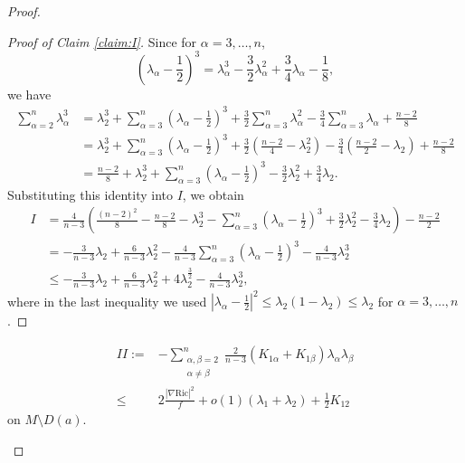 \documentclass[10pt,a4paper]{amsart}
\begin{document}
\begin{proof}
\begin{proof}[Proof of Claim \ref{claim:I}]
		Since for $\alpha = 3, \ldots, n$,
		\[
		\left(\lambda_\alpha - \frac{1}{2}\right)^3 = \lambda_\alpha^3 - \frac{3}{2}\lambda_\alpha^2 + \frac{3}{4}\lambda_\alpha - \frac{1}{8},
		\]
		we have
		\begin{align*}
			\sum_{\alpha=2}^n \lambda_\alpha^3 &= \lambda_2^3 + \sum_{\alpha=3}^n\left(\lambda_\alpha - \frac{1}{2}\right)^3 + \frac{3}{2}\sum_{\alpha=3}^n\lambda_\alpha^2 - \frac{3}{4}\sum_{\alpha=3}^n\lambda_\alpha + \frac{n-2}{8} \\
			&= \lambda_2^3 + \sum_{\alpha=3}^n\left(\lambda_\alpha - \frac{1}{2}\right)^3 + \frac{3}{2}\left(\frac{n-2}{4} - \lambda_2^2\right) - \frac{3}{4}\left(\frac{n-2}{2} - \lambda_2\right) + \frac{n-2}{8} \\
			&= \frac{n-2}{8} + \lambda_2^3 + \sum_{\alpha=3}^n\left(\lambda_\alpha - \frac{1}{2}\right)^3 - \frac{3}{2}\lambda_2^2 + \frac{3}{4}\lambda_2.
		\end{align*}
		Substituting this identity into $I$, we obtain
		\begin{align*}
			I &= \frac{4}{n-3}\left(\frac{(n-2)^2}{8} - \frac{n-2}{8} - \lambda_2^3 - \sum_{\alpha=3}^n\left(\lambda_\alpha - \frac{1}{2}\right)^3 + \frac{3}{2}\lambda_2^2 - \frac{3}{4}\lambda_2\right) - \frac{n-2}{2} \\
			&= -\frac{3}{n-3}\lambda_2 + \frac{6}{n-3}\lambda_2^2 - \frac{4}{n-3}\sum_{\alpha=3}^n\left(\lambda_\alpha - \frac{1}{2}\right)^3 - \frac{4}{n-3}\lambda_2^3 \\
			&\leq -\frac{3}{n-3}\lambda_2 + \frac{6}{n-3}\lambda_2^2 + 4\lambda_2^{\frac{3}{2}} - \frac{4}{n-3}\lambda_2^3,
		\end{align*}
		where in the last inequality we used $|\lambda_{\alpha} - \frac{1}{2}|^2 \leq \lambda_2(1-\lambda_2) \leq \lambda_2$ for $\alpha = 3, \ldots, n$.
	\end{proof}
	
	
	\begin{claim}\label{claim:II}
		\begin{equation*}\label{eq:claim-II}
			\begin{aligned}	
			II  :=& -\sum_{\substack{\alpha,\beta=2 \\ \alpha\neq\beta}}^n \frac{2}{n-3}(K_{1\alpha} + K_{1\beta})\lambda_\alpha\lambda_\beta\\
			\leq& 2\frac{|\nabla \mathrm{Ric}|^2}{f} + o(1)(\lambda_1+\lambda_2) + \frac{1}{2}K_{12}
				\end{aligned}
		\end{equation*}
		on $M \setminus D(a)$.
	\end{claim}
	

\end{proof}
\end{document}

